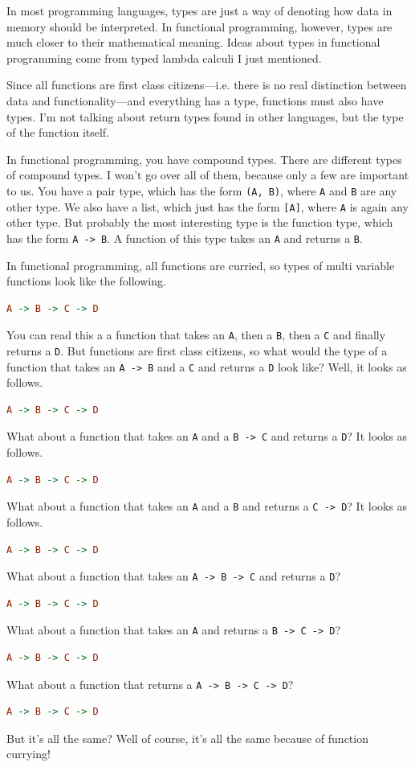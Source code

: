 \documentclass[11pt]{article}
\begin{document}
In most programming languages, types are just a way of denoting how data in
memory should be interpreted. In functional programming, however, types are
much closer to their mathematical meaning. Ideas about types in functional
programming come from typed lambda calculi I just mentioned.

Since all functions are first class citizens---i.e. there is no real
distinction between data and functionality---and everything has a type,
functions must also have types. I'm not talking about return types found in
other languages, but the type of the function itself.

In functional programming, you have compound types. There are different types
of compound types. I won't go over all of them, because only a few are
important to us. You have a pair type, which has the form \texttt{(A, B)},
where \texttt{A} and \texttt{B} are any other type. We also have a list, which
just has the form \texttt{[A]}, where \texttt{A} is again any other type. But
probably the most interesting type is the function type, which has the form
\texttt{A -> B}. A function of this type takes an \texttt{A} and returns a
\texttt{B}.

In functional programming, all functions are curried, so types of multi
variable functions look like the following.
\begin{lstlisting}[language=Haskell]
A -> B -> C -> D
\end{lstlisting}
You can read this a a function that takes an \texttt{A}, then a \texttt{B},
then a \texttt{C} and finally returns a \texttt{D}. But functions are first
class citizens, so what would the type of a function that takes an \texttt{A ->
B} and a \texttt{C} and returns a \texttt{D} look like? Well, it looks as
follows.
\begin{lstlisting}[language=Haskell]
A -> B -> C -> D
\end{lstlisting}
What about a function that takes an \texttt{A} and a \texttt{B -> C} and
returns a \texttt{D}? It looks as follows.
\begin{lstlisting}[language=Haskell]
A -> B -> C -> D
\end{lstlisting}
What about a function that takes an \texttt{A} and a \texttt{B} and returns a
\texttt{C -> D}? It looks as follows.
\begin{lstlisting}[language=Haskell]
A -> B -> C -> D
\end{lstlisting}
What about a function that takes an \texttt{A -> B -> C} and returns a
\texttt{D}?
\begin{lstlisting}[language=Haskell]
A -> B -> C -> D
\end{lstlisting}
What about a function that takes an \texttt{A} and returns a \texttt{B -> C ->
D}?
\begin{lstlisting}[language=Haskell]
A -> B -> C -> D
\end{lstlisting}
What about a function that returns a \texttt{A -> B -> C -> D}?
\begin{lstlisting}[language=Haskell]
A -> B -> C -> D
\end{lstlisting}
But it's all the same? Well of course, it's all the same because of function
currying!
\end{document}
